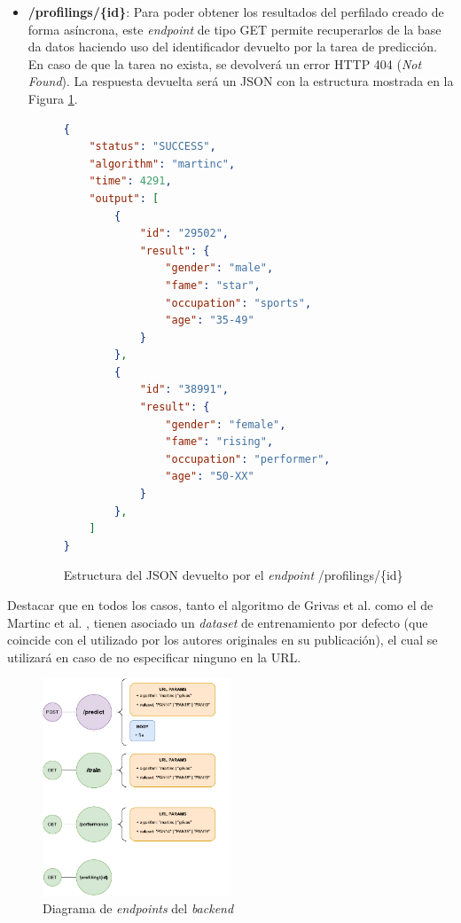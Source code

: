 \begin{itemize}
	\item \textbf{/profilings/\{id\}}: Para poder obtener los resultados del perfilado creado de forma asíncrona, este \textit{endpoint} de tipo GET
		permite recuperarlos de la base da datos haciendo uso del identificador devuelto por la tarea de predicción. En caso de que la tarea
		no exista, se devolverá un error HTTP 404 (\textit{Not Found}). La respuesta devuelta será un JSON con la estructura mostrada en la Figura \ref{fig:profiling_json}.

		\begin{figure}[H]
			\begin{lstlisting}[language=json]
{
	"status": "SUCCESS",
	"algorithm": "martinc",
	"time": 4291,
	"output": [
		{
			"id": "29502",
			"result": {
				"gender": "male",
				"fame": "star",
				"occupation": "sports",
				"age": "35-49"
			}
		},
		{
			"id": "38991",
			"result": {
				"gender": "female",
				"fame": "rising",
				"occupation": "performer",
				"age": "50-XX"
			}
		},
	]
}\end{lstlisting}
			\caption{Estructura del JSON devuelto por el \textit{endpoint} /profilings/\{id\}}
			\label{fig:profiling_json}
		\end{figure}
\end{itemize}

Destacar que en todos los casos, tanto el algoritmo de Grivas et al. \cite{grivas2015author} como el de Martinc et al. \cite{martinc2019hot}, tienen asociado un \textit{dataset} de entrenamiento por defecto (que coincide
con el utilizado por los autores originales en su publicación), el cual se utilizará en caso de no especificar ninguno en la URL.

\begin{figure}[H]
	\centering
	\includegraphics[width=0.5\textwidth]{diagramas/endpoints.pdf}
	\caption{Diagrama de \textit{endpoints} del \textit{backend}}
	\label{fig:implementacion_endpoints}
\end{figure}

